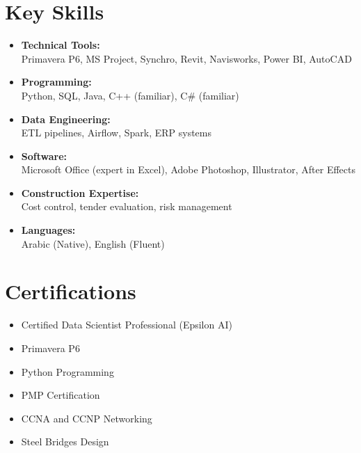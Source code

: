 \documentclass[10pt, letterpaper]{article}
\begin{document}
\section{Key Skills}
\vspace{-1.5ex} %
\begin{itemize}[leftmargin=*, itemsep=0.5ex] %
    \item \textbf{Technical Tools:} \\
    Primavera P6, MS Project, Synchro, Revit, Navisworks, Power BI, AutoCAD
    \item \textbf{Programming:} \\
    Python, SQL, Java, C++ (familiar), C\# (familiar)
    \item \textbf{Data Engineering:} \\
    ETL pipelines, Airflow, Spark, ERP systems
    \item \textbf{Software:} \\
    Microsoft Office (expert in Excel), Adobe Photoshop, Illustrator, After Effects
    \item \textbf{Construction Expertise:} \\
    Cost control, tender evaluation, risk management
    \item \textbf{Languages:} \\
    Arabic (Native), English (Fluent)
\end{itemize}

\section{Certifications}
\vspace{-1ex} %
\begin{itemize}[leftmargin=*, itemsep=0.5ex] %
    \item Certified Data Scientist Professional (Epsilon AI)
    \item Primavera P6
    \item Python Programming
    \item PMP Certification
    \item CCNA and CCNP Networking
    \item Steel Bridges Design
\end{itemize}
\end{document}
